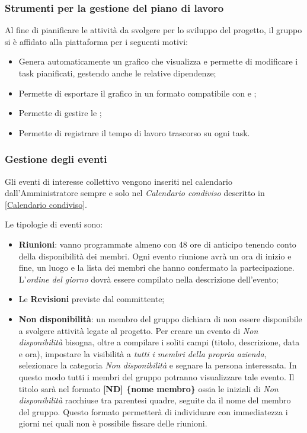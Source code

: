 	\subsubsection{Strumenti per la gestione del piano di lavoro}
	
	Al fine di pianificare le attività da svolgere per lo sviluppo del progetto, il gruppo si è affidato alla piattaforma  per i seguenti motivi:
	\begin{itemize}
		\item Genera automaticamente un grafico  che visualizza e permette di modificare i task pianificati, gestendo anche le relative dipendenze;
		\item Permette di esportare il grafico  in un formato compatibile con  e ;
		\item Permette di gestire le ;
		\item Permette di registrare il tempo di lavoro trascorso su ogni task.
	\end{itemize}

	\subsubsection{Gestione degli eventi}
	
	Gli eventi di interesse collettivo vengono inseriti nel calendario dall'Amministratore sempre e solo nel \emph{Calendario condiviso} descritto in \ref{Calendario condiviso}.
	
	Le tipologie di eventi sono:
	\begin{itemize}
		\item \textbf{Riunioni}: vanno programmate almeno con 48 ore di anticipo tenendo conto della disponibilità dei membri. Ogni evento riunione avrà un ora di inizio e fine, un luogo e la lista dei membri che hanno confermato la partecipazione. L'\emph{ordine del giorno} dovrà essere compilato nella descrizione dell'evento;
		\item Le \textbf{Revisioni} previste dal committente;
		\item \textbf{Non disponibilità}: un membro del gruppo dichiara di non essere disponibile a svolgere attività legate al progetto. Per creare un evento di \emph{Non disponibilità} bisogna, oltre a compilare i soliti campi (titolo, descrizione, data e ora), impostare la visibilità a \emph{tutti i membri della propria azienda}, selezionare la categoria \emph{Non disponibilità} e segnare la persona interessata. In questo modo tutti i membri del gruppo \GroupName{} potranno visualizzare tale evento. 
		Il titolo sarà nel formato \textbf{[ND] \{nome membro\}} ossia le iniziali di \emph{Non disponibilità} racchiuse tra parentesi quadre, seguite da il nome del membro del gruppo. Questo formato permetterà di individuare con immediatezza i giorni nei quali non è possibile fissare delle riunioni.
	\end{itemize}


